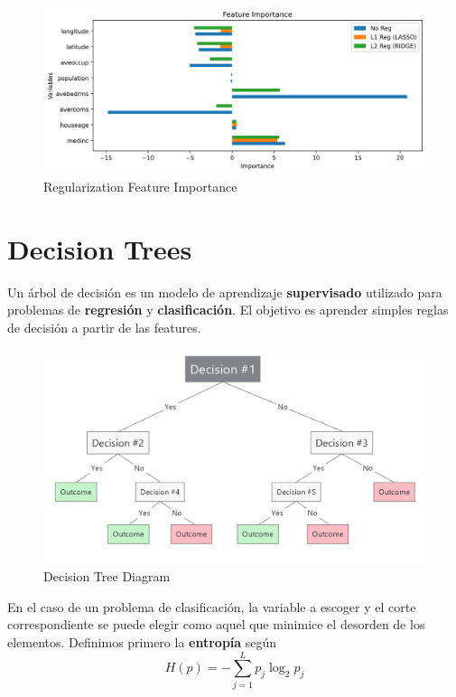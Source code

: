 \begin{figure}[H]
    \center
    \includegraphics[scale=0.5]{notebooks/ML/img/regularization_feature_importance.png}
    \caption{Regularization Feature Importance}
\end{figure}


\section{Decision Trees}

Un árbol de decisión es un modelo de aprendizaje \textbf{supervisado} utilizado para problemas de \textbf{regresión} y \textbf{clasificación}. El objetivo es aprender simples reglas de decisión a partir de las features. 

\begin{figure}[H]
    \center
    \includegraphics[scale=0.25]{notebooks/ML/img/decision_tree_diagram.png}
    \caption{Decision Tree Diagram}
\end{figure}

En el caso de un problema de clasificación, la variable a escoger y el corte correspondiente se puede elegir como aquel que minimice el desorden de los elementos. Definimos primero la \textbf{entropía} según 
$$H(p) = - \sum_{j=1}^{L}p_j\log_{2}p_j$$

